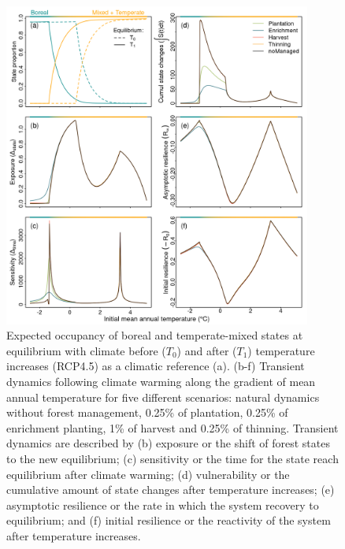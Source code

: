 \hypertarget{fig:num-res1}{%
\begin{figure}
\centering
\includegraphics[width=0.9\textwidth,height=\textheight]{manuscript/img/num-result.png}
\caption[{Expected occupancy of boreal and temperate-mixed states at
equilibrium with climate before (\(T_0\)) and after (\(T_1\))
temperature increases (RCP4.5) as a climatic reference}]{Expected
occupancy of boreal and temperate-mixed states at equilibrium with
climate before (\(T_0\)) and after (\(T_1\)) temperature increases
(RCP4.5) as a climatic reference (a). (b-f) Transient dynamics following
climate warming along the gradient of mean annual temperature for five
different scenarios: natural dynamics without forest management, 0.25\%
of plantation, 0.25\% of enrichment planting, 1\% of harvest and 0.25\%
of thinning. Transient dynamics are described by (b) exposure or the
shift of forest states to the new equilibrium; (c) sensitivity or the
time for the state reach equilibrium after climate warming; (d)
vulnerability or the cumulative amount of state changes after
temperature increases; (e) asymptotic resilience or the rate in which
the system recovery to equilibrium; and (f) initial resilience or the
reactivity of the system after temperature increases.}
\label{fig:num-res1}
\end{figure}
}

